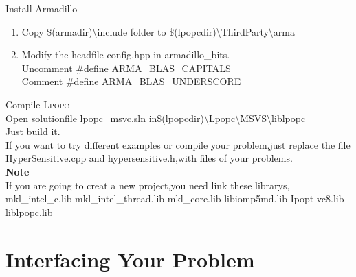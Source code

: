 \documentclass[10pt]{article}
\newcommand{\LPOPC}{\textsc{Lpopc}\xspace}
\begin{document}
  Install Armadillo
  \begin{enumerate}
  	\item Copy \$(armadir)\textbackslash include folder to \$(lpopcdir)\textbackslash ThirdParty\textbackslash arma
  	\item Modify the headfile config.hpp in armadillo\_bits.\\
  	Uncomment \#define ARMA\_BLAS\_CAPITALS\\
  	Comment \#define ARMA\_BLAS\_UNDERSCORE\\
  	
  \end{enumerate}
  Compile \LPOPC \\
  Open solutionfile lpopc\_msvc.sln in\$(lpopcdir)\textbackslash Lpopc\textbackslash MSVS\textbackslash liblpopc\\
  Just build it.\\
  If you want to try different examples or compile your problem,just replace the file HyperSensitive.cpp and hypersensitive.h,with files of your problems.\\
  \textbf{Note}\\
  If you are going to creat a new project,you need link these librarys,\\
   mkl\_intel\_c.lib mkl\_intel\_thread.lib mkl\_core.lib libiomp5md.lib  Ipopt-vc8.lib liblpopc.lib
  
  \section{Interfacing Your Problem}
\end{document}
